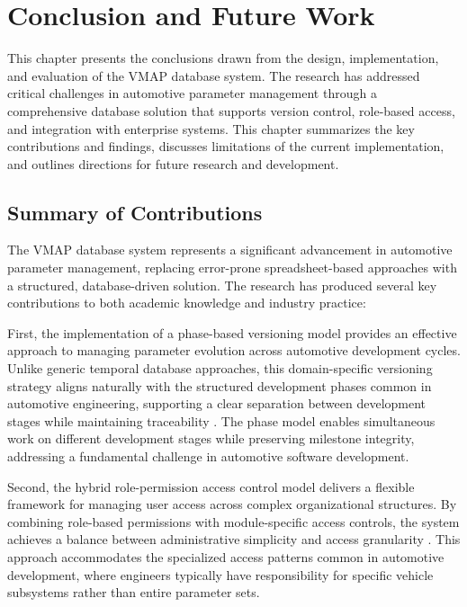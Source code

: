 \chapter{Conclusion and Future Work}
\label{chap:conclusion}

This chapter presents the conclusions drawn from the design, implementation, and evaluation of the \ac{VMAP} database system. The research has addressed critical challenges in automotive parameter management through a comprehensive database solution that supports version control, role-based access, and integration with enterprise systems. This chapter summarizes the key contributions and findings, discusses limitations of the current implementation, and outlines directions for future research and development.

\section{Summary of Contributions}
\label{sec:contributions-summary}

The \ac{VMAP} database system represents a significant advancement in automotive parameter management, replacing error-prone spreadsheet-based approaches with a structured, database-driven solution. The research has produced several key contributions to both academic knowledge and industry practice:

First, the implementation of a phase-based versioning model provides an effective approach to managing parameter evolution across automotive development cycles. Unlike generic temporal database approaches, this domain-specific versioning strategy aligns naturally with the structured development phases common in automotive engineering, supporting a clear separation between development stages while maintaining traceability \cite{broy2006challenges}. The phase model enables simultaneous work on different development stages while preserving milestone integrity, addressing a fundamental challenge in automotive software development.

Second, the hybrid role-permission access control model delivers a flexible framework for managing user access across complex organizational structures. By combining role-based permissions with module-specific access controls, the system achieves a balance between administrative simplicity and access granularity \cite{ferraiolo2011policy}. This approach accommodates the specialized access patterns common in automotive development, where engineers typically have responsibility for specific vehicle subsystems rather than entire parameter sets.

